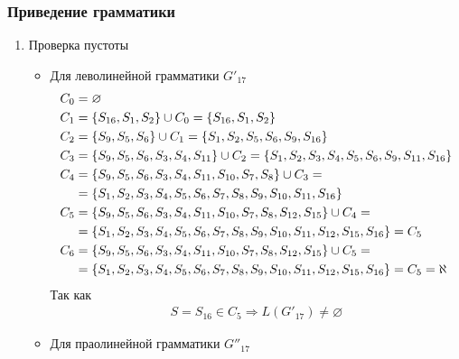 \subsubsection{Приведение грамматики}
\begin{enumerate}
	\item Проверка пустоты
	      \begin{itemize}
		      \item Для леволинейной грамматики \(G'_{17}\)
		            \begin{align*}
			            C_0 & = \varnothing                                                                                                                                               \\
			            C_1 & = \left\{S_{16}, S_1, S_2\right\} \cup C_0 = \left\{S_{16}, S_1, S_2\right\}                                                                                                  \\
			            C_2 & = \left\{S_9, S_5, S_6\right\} \cup C_1 = \left\{S_1, S_2, S_5, S_6, S_9, S_{16}\right\}                                                                                      \\
			            C_3 & = \left\{S_9, S_5, S_6, S_3, S_4, S_{11}\right\} \cup C_2 = \left\{S_1, S_2, S_3, S_4, S_5, S_6, S_9, S_{11}, S_{16}\right\}                                                  \\
			            C_4 & = \left\{S_9, S_5, S_6, S_3, S_4, S_{11}, S_{10}, S_7, S_8\right\} \cup C_3 =                                                                                        \\
			                & = \left\{S_1, S_2, S_3, S_4, S_5, S_6, S_7, S_8, S_9, S_{10}, S_{11}, S_{16}\right\}                                                                                 \\
			            C_5 & = \left\{S_9, S_5, S_6, S_3, S_4, S_{11}, S_{10}, S_7, S_8, S_{12}, S_{15}\right\} \cup C_4 =                                                                        \\
			                & = \left\{S_1, S_2, S_3, S_4, S_5, S_6, S_7, S_8, S_9, S_{10}, S_{11}, S_{12}, S_{15}, S_{16}\right\} = C_5                                                           \\
			            C_6 & = \left\{S_9, S_5, S_6, S_3, S_4, S_{11}, S_{10}, S_7, S_8, S_{12}, S_{15}\right\} \cup C_5 =                                                                        \\
			                & = \left\{S_1, S_2, S_3, S_4, S_5, S_6, S_7, S_8, S_9, S_{10}, S_{11}, S_{12}, S_{15}, S_{16}\right\} = C_5                                                  = \aleph
		            \end{align*}
		            Так как
		            \begin{align}
			            S = S_{16} \in C_5 \Longrightarrow L(G'_{17}) \not= \varnothing
		            \end{align}
		      \item Для праолинейной грамматики \(G''_{17}\)
	      \end{itemize}
\end{enumerate}
